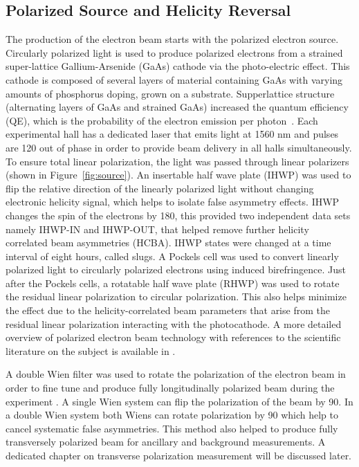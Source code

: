 \subsection{Polarized Source and Helicity Reversal}%
\label{Polarized Source and Helicity Reversal}

The production of the electron beam starts with the polarized electron source. Circularly polarized light is used to produce polarized electrons from a strained super-lattice Gallium-Arsenide (GaAs) cathode via the photo-electric effect. This cathode is composed of several layers of material containing GaAs with varying amounts of phosphorus doping, grown on a substrate. 
Supperlattice structure (alternating layers of GaAs and strained GaAs) increased the quantum efficiency (QE), which is the probability of the electron emission per photon~\cite{presentation:poelker_source_1436}.
Each experimental hall has a dedicated laser that emits light at 1560 nm and pulses are 120\degrees{} out of phase in order to provide beam delivery in all halls simultaneously. To ensure total linear polarization,  the light was passed through linear polarizers (shown in Figure~\ref{fig:source}). 
An insertable half wave plate (IHWP) was used to flip the relative direction of the linearly polarized light without changing electronic helicity signal, which helps to isolate false asymmetry effects. IHWP changes the spin of the electrons by 180\degrees{}, this provided two independent data sets namely IHWP-IN and IHWP-OUT, that helped remove further helicity correlated beam asymmetries (HCBA). IHWP states were changed at a time interval of eight hours, called slugs. A Pockels cell was used to convert linearly polarized light to circularly polarized electrons using induced birefringence. Just after the Pockels cells, a rotatable half wave plate (RHWP) was used to rotate the residual linear polarization to circular polarization. This also helps minimize the effect due to the helicity-correlated beam parameters that arise from the residual linear polarization interacting with the photocathode.
A more detailed overview of polarized electron beam technology with references to the scientific literature on the subject is available in \cite{jlab_source_book}.

A double Wien filter was used to rotate the polarization of the electron beam in order to fine tune and produce fully longitudinally polarized beam during the experiment \cite{grames_double_wien_proceedings}. A single Wien system can flip the polarization of the beam by 90\degrees{}. In a double Wien system both Wiens can rotate polarization by 90\degrees{} which help to cancel systematic false asymmetries. This method also helped to produce fully transversely polarized beam for ancillary and background measurements. A dedicated chapter on transverse polarization measurement will be discussed later.


